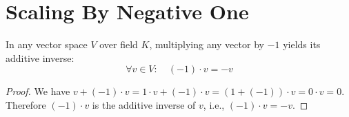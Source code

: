 \section{Scaling By Negative One}

\begin{theorem}
  \label{theorem : neg_one_smul}
  \leanok
  In any vector space $V$ over field $K$, multiplying any vector by $-1$ yields its additive inverse:
  $$\forall v \in V: \quad (-1) \cdot v = -v$$
\end{theorem}

\begin{proof}
  We have $v + (-1) \cdot v = 1 \cdot v + (-1) \cdot v = (1 + (-1)) \cdot v = 0 \cdot v = 0$. Therefore $(-1) \cdot v$ is the additive inverse of $v$, i.e., $(-1) \cdot v = -v$.
\end{proof}
